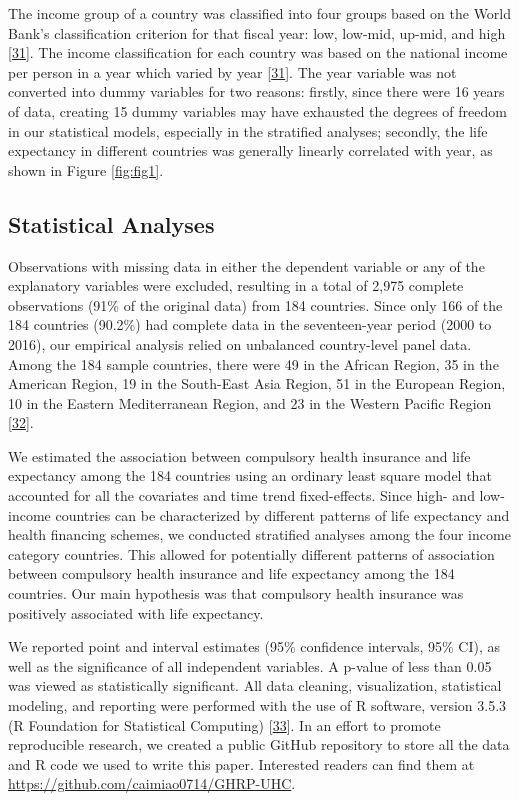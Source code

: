 \documentclass[]{elsarticle} %
\begin{document}
The income group of a country was classified into four groups based on the World Bank's classification criterion for that fiscal year: low, low-mid, up-mid, and high {[}\protect\hyperlink{ref-worldbankincome}{31}{]}. The income classification for each country was based on the national income per person in a year which varied by year {[}\protect\hyperlink{ref-worldbankincome}{31}{]}.
The year variable was not converted into dummy variables for two reasons: firstly, since there were 16 years of data, creating 15 dummy variables may have exhausted the degrees of freedom in our statistical models, especially in the stratified analyses; secondly, the life expectancy in different countries was generally linearly correlated with year, as shown in Figure \ref{fig:fig1}.

\hypertarget{statistical-analyses}{%
\subsection{Statistical Analyses}\label{statistical-analyses}}

Observations with missing data in either the dependent variable or any of the explanatory variables were excluded, resulting in a total of 2,975 complete observations (91\% of the original data) from 184 countries.
Since only 166 of the 184 countries (90.2\%) had complete data in the seventeen-year period (2000 to 2016), our empirical analysis relied on unbalanced country-level panel data.
Among the 184 sample countries, there were 49 in the African Region, 35 in the American Region, 19 in the South-East Asia Region, 51 in the European Region, 10 in the Eastern Mediterranean Region, and 23 in the Western Pacific Region {[}\protect\hyperlink{ref-WHOregion}{32}{]}.

We estimated the association between compulsory health insurance and life expectancy among the 184 countries using an ordinary least square model that accounted for all the covariates and time trend fixed-effects.
Since high- and low-income countries can be characterized by different patterns of life expectancy and health financing schemes, we conducted stratified analyses among the four income category countries. This allowed for potentially different patterns of association between compulsory health insurance and life expectancy among the 184 countries.
Our main hypothesis was that compulsory health insurance was positively associated with life expectancy.

We reported point and interval estimates (95\% confidence intervals, 95\% CI), as well as the significance of all independent variables.
A p-value of less than 0.05 was viewed as statistically significant.
All data cleaning, visualization, statistical modeling, and reporting were performed with the use of R software, version 3.5.3 (R Foundation for Statistical Computing) {[}\protect\hyperlink{ref-R353}{33}{]}.
In an effort to promote reproducible research, we created a public GitHub repository to store all the data and R code we used to write this paper.
Interested readers can find them at \url{https://github.com/caimiao0714/GHRP-UHC}.
\end{document}
